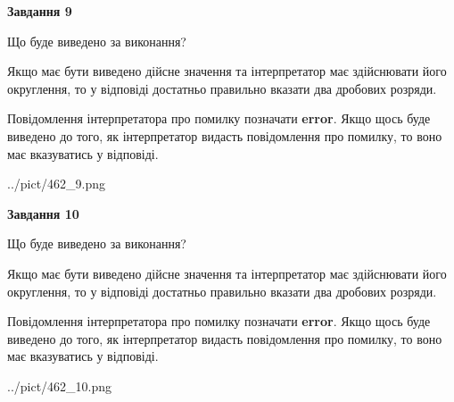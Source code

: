 \documentclass[12pt, ukrainian]{article}
\begin{document}
{\begin {Large}
{\begin {center}\textbf{Завдання 9}\end {center}}\par
Що буде виведено за виконання? \par

Якщо має бути виведено дійсне значення та інтерпретатор має здійснювати його округлення, 
то у відповіді достатньо правильно вказати два дробових розряди.

Повідомлення інтерпретатора про помилку позначати \textbf{error}.
Якщо щось буде виведено до того, як інтерпретатор видасть повідомлення про помилку, 
то воно має вказуватись у відповіді. \par

\begin{center}
	{../pict/462_9.png}
\end{center}
\newpage

{\begin {center}\textbf{Завдання 10}\end {center}}\par
Що буде виведено за виконання? \par

Якщо має бути виведено дійсне значення та інтерпретатор має здійснювати його округлення, 
то у відповіді достатньо правильно вказати два дробових розряди.

Повідомлення інтерпретатора про помилку позначати \textbf{error}.
Якщо щось буде виведено до того, як інтерпретатор видасть повідомлення про помилку, 
то воно має вказуватись у відповіді. \par

\begin{center}
	{../pict/462_10.png}
\end{center}
\newpage

\end {Large}}
\end{document}
